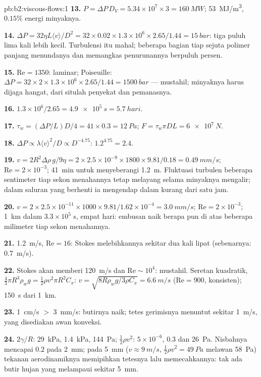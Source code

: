 \begin{solution}{pb:b2:viscous-flows:1}
\textbf{13.} $P = \Delta P\,D_V = 5.34 \times 10^7 \times 3 = \qty{160}{MW}$;
\qty{53}{MJ/m^3}, $0.15\%$ energi minyaknya.

\textbf{14.} $\Delta P = 32\eta L\langle v\rangle/D^2 = 32 \times 0.02 \times 1.3 \times 10^6
\times 2.65/1.44 = \qty{15}{bar}$: tiga puluh lima kali lebih kecil. Turbulensi itu
mahal; beberapa bagian tiap sejuta polimer panjang menundanya dan memangkas
penurunannya berpuluh persen.

\textbf{15.} $\mathrm{Re} = 1350$: laminar; Poiseuille: $\Delta P = 32 \times 2 \times 1.3 \times
10^6 \times 2.65/1.44 = \qty{1500}{bar}$ --- mustahil; minyaknya harus dijaga
hangat, dari situlah penyekat dan pemanasnya.

\textbf{16.} $1.3 \times 10^6/2.65 = \qty{4.9e5}{s} = \qty{5.7}{hari}$.

\textbf{17.} $\tau_w = (\Delta P/L)D/4 = 41 \times 0.3 = \qty{12}{Pa}$; $F = \tau_w\pi DL =
\qty{6e7}{N}$.

\textbf{18.} $\Delta P \propto \lambda\langle v\rangle^2/D \propto D^{-4.75}$: $1.2^{4.75} = 2.4$.

\textbf{19.} $v = 2R^2\Delta\rho\,g/9\eta = 2 \times 2.5 \times 10^{-9} \times 1800 \times 9.81/
0.18 = \qty{0.49}{mm/s}$; $\mathrm{Re} = 2 \times 10^{-3}$; \qty{41}{min} untuk menyeberangi
\qty{1.2}{m}. Fluktuasi turbulen beberapa sentimeter tiap sekon
menahannya tetap melayang selama minyaknya mengalir; dalam saluran yang berhenti ia mengendap dalam
kurang dari satu jam.

\textbf{20.} $v = 2 \times 2.5 \times 10^{-11} \times 1000 \times 9.81/1.62 \times 10^{-4} =
\qty{3.0}{mm/s}$; $\mathrm{Re} = 2 \times 10^{-3}$; \qty{1}{km} dalam $3.3 \times 10^5$ s, empat
hari: embusan naik berapa pun di atas beberapa milimeter tiap sekon menahannya.

\textbf{21.} \qty{1.2}{m/s}, $\mathrm{Re} = 16$: Stokes melebihkannya sekitar
dua kali lipat (sebenarnya: \qty{0.7}{m/s}).

\textbf{22.} Stokes akan memberi \qty{120}{m/s} dan $\mathrm{Re} \sim 10^4$: mustahil.
Seretan kuadratik, $\tfrac43\pi R^3\rho_wg = \tfrac12\rho v^2\pi R^2C_x$: $v = \sqrt{8R
\rho_wg/3\rho C_x} = \qty{6.6}{m/s}$ ($\mathrm{Re} = 900$, konsisten); \qty{150}{s} dari
\qty{1}{km}.

\textbf{23.} \qty{1}{cm/s} $>$ \qty{3}{mm/s}: butirnya naik; tetes gerimisnya
menuntut sekitar \qty{1}{m/s}, yang disediakan awan konveksi.

\textbf{24.} $2\gamma/R$: \qty{29}{kPa}, \qty{1.4}{kPa}, \qty{144}{Pa};  $\tfrac12\rho v^2$: $5 \times 10^{-6}$, $0.3$ dan \qty{26}{Pa}. Nisbahnya
mencapai $0.2$ pada \qty{2}{mm}; pada \qty{5}{mm} ($v \approx \qty{9}{m/s}$, $\tfrac12\rho v^2 =
\qty{49}{Pa}$ melawan \qty{58}{Pa}) tekanan aerodinamiknya memipihkan
tetesnya lalu memecahkannya: tak ada butir hujan yang melampaui sekitar \qty{5}{mm}.


\end{solution}
